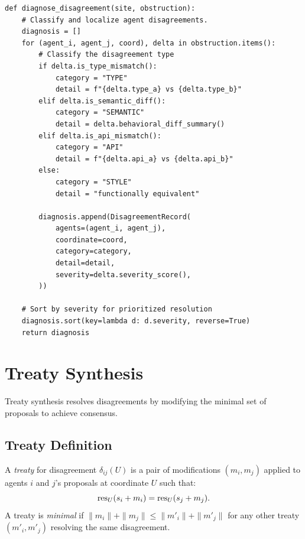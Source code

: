 \documentclass[11pt]{article}
\begin{document}
\begin{lstlisting}[style=jugeo-python,caption={Obstruction diagnosis for agent disagreements.}]
def diagnose_disagreement(site, obstruction):
    # Classify and localize agent disagreements.
    diagnosis = []
    for (agent_i, agent_j, coord), delta in obstruction.items():
        # Classify the disagreement type
        if delta.is_type_mismatch():
            category = "TYPE"
            detail = f"{delta.type_a} vs {delta.type_b}"
        elif delta.is_semantic_diff():
            category = "SEMANTIC"
            detail = delta.behavioral_diff_summary()
        elif delta.is_api_mismatch():
            category = "API"
            detail = f"{delta.api_a} vs {delta.api_b}"
        else:
            category = "STYLE"
            detail = "functionally equivalent"

        diagnosis.append(DisagreementRecord(
            agents=(agent_i, agent_j),
            coordinate=coord,
            category=category,
            detail=detail,
            severity=delta.severity_score(),
        ))

    # Sort by severity for prioritized resolution
    diagnosis.sort(key=lambda d: d.severity, reverse=True)
    return diagnosis
\end{lstlisting}


\section{Treaty Synthesis}\label{sec:treaty-synthesis}

Treaty synthesis resolves disagreements by modifying the minimal set
of proposals to achieve consensus.

\subsection{Treaty Definition}\label{subsec:treaty-def}

\begin{definition}[Treaty]\label{def:treaty}
A \emph{treaty} for disagreement $\delta_{ij}(U)$ is a pair of
modifications $(m_i, m_j)$ applied to agents $i$ and $j$'s proposals
at coordinate $U$ such that:
\[
  \mathrm{res}_U(s_i + m_i) = \mathrm{res}_U(s_j + m_j).
\]
A treaty is \emph{minimal} if $\|m_i\| + \|m_j\| \leq \|m'_i\| + \|m'_j\|$
for any other treaty $(m'_i, m'_j)$ resolving the same disagreement.
\end{definition}
\end{document}
